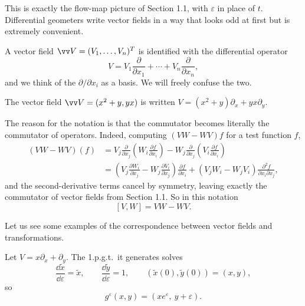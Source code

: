 This is exactly the flow-map picture of Section 1.1, with $\varepsilon$ in place of $t$. Differential geometers write vector fields in a way that looks odd at first but is extremely convenient.

\begin{notation}
	A vector field $\vv V = (V_1,\dots,V_n)^T$ is identified with the differential operator
	$$
	V = V_1\frac{\partial}{\partial x_1} + \cdots + V_n\frac{\partial}{\partial x_n},
	$$
	and we think of the $\partial/\partial x_i$ as a basis. We will freely confuse the two.
\end{notation}

\begin{example}
	The vector field $\vv V = (x^2+y, yx)$ is written $V = (x^2+y)\partial_x + yx\partial_y$.
\end{example}

The reason for the notation is that the commutator becomes literally the commutator of operators. Indeed, computing $(VW - WV)f$ for a test function $f$,
\begin{align*}
	(VW-WV)(f) &= V_j\frac{\partial}{\partial x_j}\left(W_i\frac{\partial f}{\partial x_i}\right) - W_j\frac{\partial}{\partial x_j}\left(V_i\frac{\partial f}{\partial x_i}\right)\\
	&= \left(V_j\frac{\partial W_i}{\partial x_j} - W_j\frac{\partial V_i}{\partial x_j}\right)\frac{\partial f}{\partial x_i} + \left(V_jW_i - W_jV_i\right)\frac{\partial^2f}{\partial x_i\partial x_j},
\end{align*}
and the second-derivative terms cancel by symmetry, leaving exactly the commutator of vector fields from Section 1.1. So in this notation
$$
[V,W] = VW - WV.
$$

Let us see some examples of the correspondence between vector fields and transformations.

\begin{example}
	Let $V = x\partial_x + \partial_y$. The 1.p.g.t.\ it generates solves
	$$
	\frac{\dd\tilde x}{\dd\varepsilon} = \tilde x, \qquad \frac{\dd\tilde y}{\dd\varepsilon} = 1, \qquad (\tilde x(0),\tilde y(0)) = (x,y),
	$$
	so
	$$
	g^\varepsilon(x,y) = \left(xe^\varepsilon,\ y+\varepsilon\right).
	$$
\end{example}

